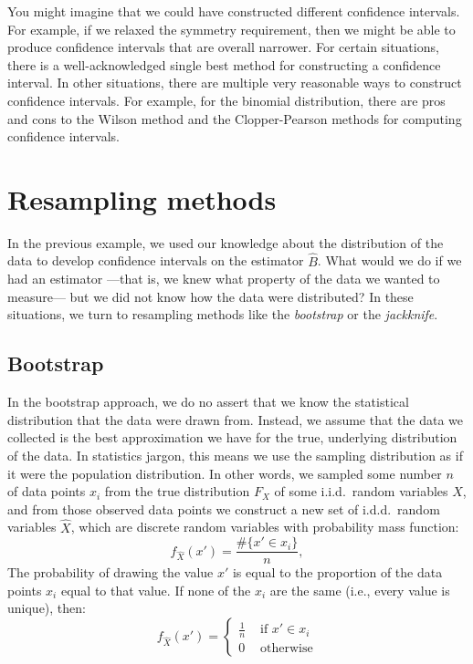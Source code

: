 You might imagine that we could have constructed different confidence intervals. For example,
if we relaxed the symmetry requirement, then we might be able to produce confidence intervals
that are overall narrower. For certain situations, there is a well-acknowledged single best
method for constructing a confidence interval. In other situations, there are multiple very
reasonable ways to construct confidence intervals. For example, for the binomial distribution,
there are pros and cons to the Wilson method and the Clopper-Pearson methods for computing
confidence intervals.

\section{Resampling methods}

In the previous example, we used our knowledge about the distribution of the
data to develop confidence intervals on the estimator $\hat{B}$. What would we
do if we had an estimator ---that is, we knew what property of the data we
wanted to measure--- but we did not know how the data were distributed?  In
these situations, we turn to resampling methods like the \emph{bootstrap} or
the \emph{jackknife}.

\subsection{Bootstrap}

In the bootstrap approach, we do no assert that we know the statistical distribution that the data were drawn from. Instead, we assume that the data we collected is the best approximation we have for the true, underlying distribution of the data. In statistics jargon, this means we use the sampling distribution as if it were the population distribution. In other words, we sampled some number $n$ of data points $x_i$ from the true distribution $F_X$ of some i.i.d.~random variables $X$, and from those observed data points we construct a new set of i.d.d.~random variables $\hat{X}$, which are discrete random variables with probability mass function:
\begin{equation*}
    f_{\hat{X}}(x') = \frac{\#\{x' \in x_i\}}{n},
\end{equation*}
The probability of drawing the value $x'$ is equal to the proportion of the data points $x_i$ equal to that value. If none of the $x_i$ are the same (i.e., every value is unique), then:
\begin{equation*}
    f_{\hat{X}}(x') = \begin{cases}
        \tfrac{1}{n} &\text{ if } x' \in x_i \\
        0 &\text{ otherwise}
    \end{cases}
\end{equation*}

